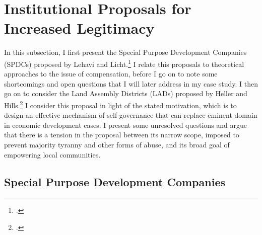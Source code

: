 {\section{Institutional Proposals for Increased Legitimacy}\label{sec:ir}

In this subsection, I first present the Special Purpose Development Companies (SPDCs) proposed by Lehavi and Licht.\footcite{lehavi07} I relate this proposals to theoretical approaches to the issue of compensation, before I go on to note some shortcomings and open questions that I will later address in my case study. I then go on to consider the Land Assembly Districts (LADs) proposed by Heller and Hills.\footcite{heller08} I consider this proposal in light of the stated motivation, which is to design an effective mechanism of self-governance that can replace eminent domain in economic development cases. I present some unresolved questions and argue that there is a tension in the proposal between its narrow scope, imposed to prevent majority tyranny and other forms of abuse, and its broad goal of empowering local communities. 

\subsection{Special Purpose Development Companies}

}

